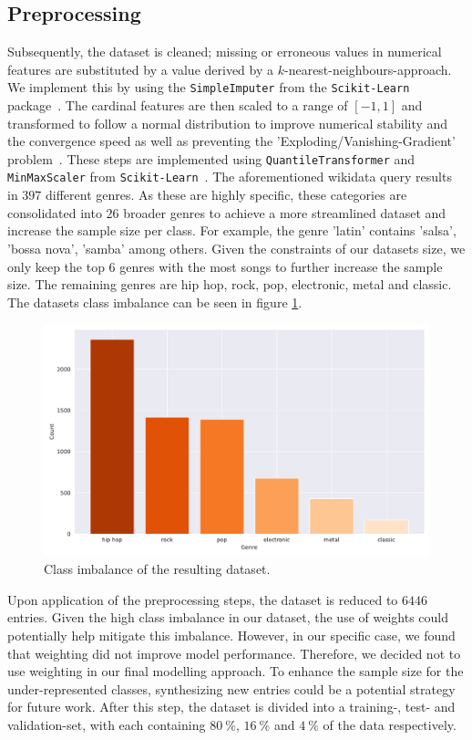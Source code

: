 \documentclass[
  12pt,
  bibliography=totoc,     %
  captions=tableheading,  %
  titlepage=firstiscover, %
]{scrartcl}
\begin{document}
\subsection{Preprocessing}
Subsequently, the dataset is cleaned; missing or erroneous values
in numerical features are substituted by a value derived by a $k$-nearest-neighbours-approach. We implement this
by using the \texttt{SimpleImputer} from the \texttt{Scikit-Learn} package~\cite{scikit-learn}.
The cardinal features are then scaled to a range of $[-1,1]$ and transformed to follow a normal distribution to improve numerical stability
and the convergence speed as well as preventing the 'Exploding/Vanishing-Gradient' problem~\cite{geron}. These steps are implemented using \texttt{QuantileTransformer} and
\texttt{MinMaxScaler} from \texttt{Scikit-Learn}~\cite{scikit-learn}.
The aforementioned wikidata query results in $397$ different genres. As these are highly specific, these categories are consolidated into $26$ broader genres to
achieve a more streamlined dataset and increase the sample size per class. For example, the genre 'latin' contains 'salsa', 'bossa nova', 'samba' among others.
Given the constraints of our datasets size, we only keep the top $6$ genres with the most songs to further increase the sample
size. The remaining genres are hip hop, rock, pop, electronic, metal and classic. The datasets class imbalance can be seen in figure \ref{fig:class-imbalance}.
\FloatBarrier
\begin{figure}[h]
  \centering
  \includegraphics[scale=0.5]{figures/genre_hist_oranges.pdf}
  \caption{Class imbalance of the resulting dataset.}
  \label{fig:class-imbalance}
\end{figure}
\FloatBarrier
\noindent
Upon application of the preprocessing steps, the dataset is reduced to $6446$ entries.
Given the high class imbalance in our dataset, the use of weights could potentially help mitigate this imbalance. However, in our specific case, we found that weighting did not improve model performance. Therefore, we decided not to use weighting in our final modelling approach.
To enhance the sample size for the under-represented classes, synthesizing new entries could be a potential strategy for future work.
After this step, the dataset is divided into a training-, test- and validation-set, with each containing $\SI{80}{\percent}$, $\SI{16}{\percent}$ and $\SI{4}{\percent}$
of the data respectively.
\end{document}
